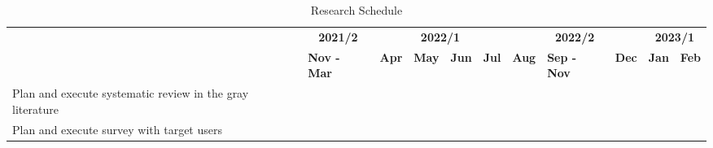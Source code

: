\begin{table}
  \centering
  \caption{Research Schedule}
  \label{tbl:schedule}
  \scriptsize
  \begin{tabular}{p{3cm}|l|llll|lll|ll}
    \bottomrule
    \rowcolor[rgb]{0.753,0.753,0.753} \multicolumn{1}{c|}{{\cellcolor[rgb]{0.753,0.753,0.753}}}                                       & \multicolumn{1}{c|}{\textbf{2021/2}} & \multicolumn{4}{c|}{\textbf{2022/1}} & \multicolumn{3}{c|}{\textbf{2022/2}} & \multicolumn{2}{c}{\textbf{2023/1}}                                                                                                                                                                                                                                            \\
    \hhline{>{\arrayrulecolor[rgb]{0.753,0.753,0.753}}->{\arrayrulecolor{black}}----------}
    \rowcolor[rgb]{0.753,0.753,0.753} \multicolumn{1}{c|}{\multirow{-2}{*}{{\cellcolor[rgb]{0.753,0.753,0.753}}\textbf{ Activities}}} & \textbf{Nov - Mar}                   & \multicolumn{1}{c}{\textbf{Apr}}     & \textbf{May}                         & \textbf{Jun}                         & \textbf{Jul}                         & \textbf{Aug}                         & \textbf{Sep - Nov}                   & \textbf{Dec}                         & \multicolumn{1}{l|}{\textbf{Jan}}    & \textbf{Feb}                         \\
    \hline
    \rowcolor[rgb]{0.914,0.914,0.914} Plan and execute systematic review in the gray literature                                       & {\cellcolor[rgb]{0.753,0.753,0.753}} &                                      &                                      &                                      &                                      &                                      &                                      &                                      &                                      &                                      \\
    Plan and execute survey with target users                                                                                         &                                      & {\cellcolor[rgb]{0.753,0.753,0.753}} &                                      &                                      &                                      &                                      &                                      &                                      &                                      &                                      \\

\end{tabular}
\end{table}
